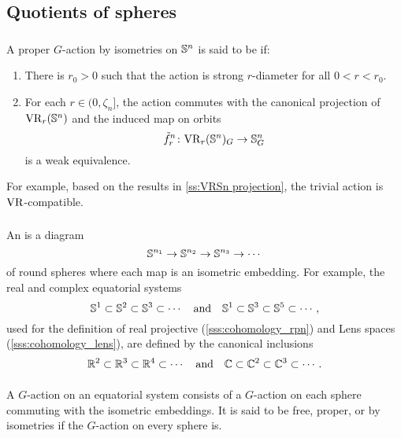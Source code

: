 \subsection{Quotients of spheres}

\subsubsection{}\label{ss:VR-compatible-Sn}

A proper \(G\)-action by isometries on \(\mathbb{S}^n\) is said to be  if:
\begin{enumerate}
	\item There is \(r_0 > 0\) such that the action is strong \(r\)-diameter for all \(0 < r < r_0\).
	\item For each \(r \in (0, \zeta_n]\), the action commutes with the canonical projection of \(\mathrm{VR}_r(\mathbb{S}^n)\) and the induced map on orbits
	\[
	\tilde f_r^n \colon \mathrm{VR}_r(\mathbb{S}^n)_G \to \mathbb{S}^n_G
	\]
	is a weak equivalence.
\end{enumerate}

For example, based on the results in \cref{ss:VRSn projection}, the trivial action is \(\mathrm{VR}\)-compatible.

\subsubsection{}\label{subsub:VR-compatible-system}

An  is a diagram
\[
\mathbb{S}^{n_1} \to \mathbb{S}^{n_2} \to \mathbb{S}^{n_3} \to \dotsb
\]
of round spheres where each map is an isometric embedding.
For example, the real and complex equatorial systems
\[
\mathbb{S}^1 \subset \mathbb{S}^2 \subset \mathbb{S}^3 \subset \dotsb
\quad\text{and}\quad
\mathbb{S}^1 \subset \mathbb{S}^3 \subset \mathbb{S}^5 \subset \dotsb,
\]
used for the definition of real projective (\cref{sss:cohomology_rpn}) and Lens spaces (\cref{sss:cohomology_lens}), are defined by the canonical inclusions
\[
\mathbb{R}^2 \subset \mathbb{R}^3 \subset \mathbb{R}^4 \subset \dotsb
\quad\text{and}\quad
\mathbb{C} \subset \mathbb{C}^2 \subset \mathbb{C}^3 \subset \dotsb.
\]

\subsubsection{}\label{ss:system VR compatible}

A \(G\)-action on an equatorial system consists of a \(G\)-action on each sphere commuting with the isometric embeddings.
It is said to be free, proper, or by isometries if the \(G\)-action on every sphere is.

